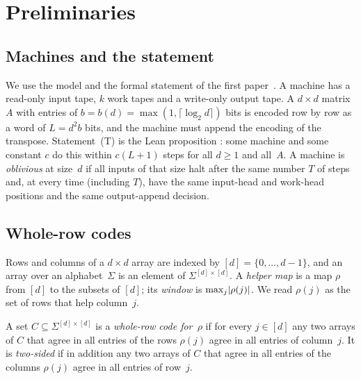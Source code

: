 \section{Preliminaries}\label{sec:prelim}

\subsection{Machines and the statement}\label{sec:prelim-machines}

We use the model and the formal statement of the first paper~\cite[Section~2]{FirstPaper2026}. A machine has a
read-only input tape, $k$ work tapes and a write-only output tape. A $d\times d$ matrix $A$ with entries of
$b=b(d)=\max(1,\lceil\log_2d\rceil)$ bits is encoded row by row as a word of $L=d^2b$ bits, and the machine must append
the encoding of the transpose. Statement~(T) is the Lean proposition : some
machine and some constant $c$ do this within $c(L+1)$ steps for all $d\ge1$ and all~$A$. A machine is
\emph{oblivious} at size~$d$ if all inputs of that size halt after the same number $T$ of steps and, at every time
(including $T$), have the same input-head and work-head positions and the same output-append decision.

\subsection{Whole-row codes}\label{sec:prelim-codes}

Rows and columns of a $d\times d$ array are indexed by $[d]=\{0,\dots,d-1\}$, and an array over an alphabet~$\Sigma$
is an element of $\Sigma^{[d]\times[d]}$. A \emph{helper map} is a map $\rho$ from $[d]$ to the subsets of $[d]$; its
\emph{window} is $\max_j\lvert \rho(j) \rvert$. We read $\rho(j)$ as the set of rows that help column~$j$.

\begin{definition}\label{def:wholerow}
A set $C\subseteq\Sigma^{[d]\times[d]}$ is a \emph{whole-row code for~$\rho$} if for every $j\in[d]$ any two arrays of
$C$ that agree in all entries of the rows $\rho(j)$ agree in all entries of column~$j$. It is \emph{two-sided} if in
addition any two arrays of $C$ that agree in all entries of the columns $\rho(j)$ agree in all entries of row~$j$.
\end{definition}

